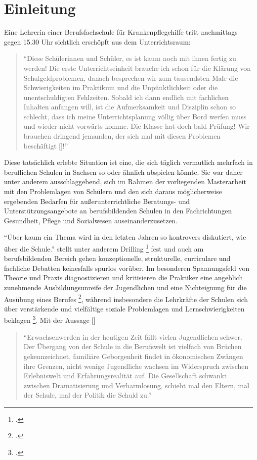 \section{Einleitung}
\label{sec:Einleitung}

Eine Lehrerin einer Berufsfachschule für Krankenpflegehilfe tritt nachmittags gegen 15.30 Uhr sichtlich erschöpft aus dem Unterrichtsraum:
\begin{quotation}
\noindent
"`Diese Schülerinnen und Schüler, es ist kaum noch mit ihnen fertig zu werden! Die erste Unterrichtseinheit brauche ich schon für die Klärung von Schulgeldproblemen, danach besprechen wir zum tausendsten Male die Schwierigkeiten im Praktikum und die Unpünktlichkeit oder die unentschuldigten Fehlzeiten. Sobald ich dann endlich mit fachlichen Inhalten anfangen will, ist die Aufmerksamkeit und Disziplin schon so schlecht, dass ich meine Unterrichtsplanung völlig über Bord werfen muss und wieder nicht vorwärts komme. Die Klasse hat doch bald Prüfung! Wir brauchen dringend jemanden, der sich mal mit diesen Problemen beschäftigt [\punkte]!"'
\end{quotation}

\noindent
Diese tatsächlich erlebte Situation ist eine, die sich täglich vermutlich mehrfach in beruflichen Schulen in Sachsen so oder ähnlich abspielen könnte. Sie war daher unter anderem ausschlaggebend, sich im Rahmen der vorliegenden Masterarbeit mit den Problemlagen von Schülern und den sich daraus möglicherweise ergebenden Bedarfen für außerunterrichtliche Beratungs- und Unterstützungsangebote an berufsbildenden Schulen in den Fachrichtungen Gesundheit, Pflege und Sozialwesen auseinanderzusetzen. 

"`Über kaum ein Thema wird in den letzten Jahren so kontrovers diskutiert, wie über die Schule."' stellt unter anderem Drilling \footcite[9]{Drilling2009} fest und auch am berufsbildenden Bereich gehen konzeptionelle, strukturelle, curriculare und fachliche Debatten keinesfalls spurlos vorüber. Im besonderen Spannungsfeld von Theorie und Praxis diagnostizieren und kritisieren die Praktiker eine angeblich zunehmende Ausbildungsunreife der Jugendlichen und eine Nichteignung für die Ausübung eines Berufes \footcite[vgl.]{Ehrenthal2005}, während insbesondere die Lehrkräfte der Schulen sich über verstärkende und vielfältige soziale Problemlagen und Lernschwierigkeiten beklagen \footcite[vgl.][13]{SMSSS2009}. Mit der Aussage [\punkte]

\begin{quotation}
\noindent
"`Erwachsenwerden in der heutigen Zeit fällt vielen Jugendlichen schwer. Der Übergang von der Schule in die Berufswelt ist vielfach von Brüchen gekennzeichnet, familiäre Geborgenheit findet in ökonomischen Zwängen ihre Grenzen, nicht wenige Jugendliche wachsen im Widerspruch zwischen Erlebniswelt und Erfahrungsrealität auf. Die Gesellschaft schwankt zwischen Dramatisierung und Verharmlosung, schiebt mal den Eltern, mal der Schule, mal der Politik die Schuld zu."' 
\end{quotation}

